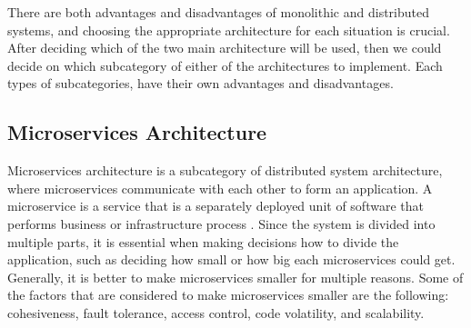 
There are both advantages and disadvantages of monolithic and distributed systems, and choosing the appropriate architecture for each situation is crucial.
After deciding which of the two main architecture will be used, then we could decide on which subcategory of either of the architectures to implement.
Each types of subcategories, have their own advantages and disadvantages.

\subsection[Microservices Architecture]{Microservices Architecture}

Microservices architecture is a subcategory of distributed system architecture, where microservices communicate with each other to form an application.
A microservice is a service that is a separately deployed unit of software that performs business or infrastructure process \cite{Gandhi_Richards_Ford_2024}.
Since the system is divided into multiple parts, it is essential when making decisions how to divide the application,
such as deciding how small or how big each microservices could get. Generally, it is better to make microservices smaller for
multiple reasons. Some of the factors that are considered to make microservices
smaller are the following: cohesiveness, fault tolerance, access control, code volatility, and scalability.

